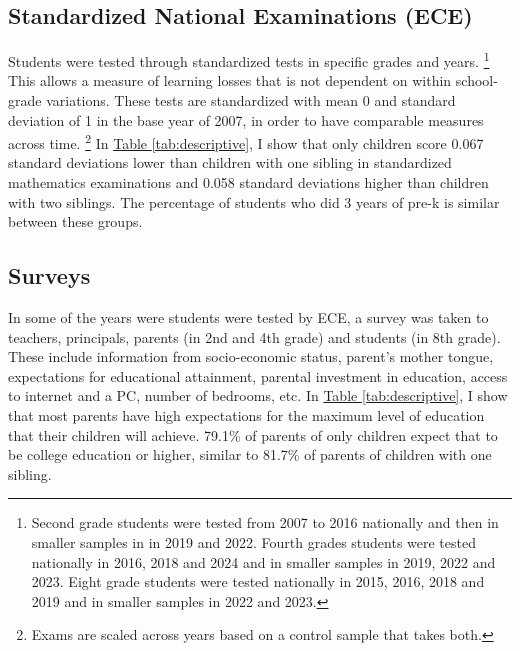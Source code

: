 \subsection{Standardized National Examinations (ECE)}

Students were tested through standardized tests in specific grades and years. \footnote{Second grade students were tested from 2007 to 2016 nationally and then in smaller samples in in 2019 and 2022. Fourth grades students were tested nationally in 2016, 2018 and 2024 and in smaller samples in 2019, 2022 and 2023. Eight grade students were tested nationally in 2015, 2016, 2018 and 2019 and in smaller samples in 2022 and 2023.} This allows a measure of learning losses that is not dependent on within school-grade variations. These tests are standardized with mean 0 and standard deviation of 1 in the base year of 2007, in order to have comparable measures across time. \footnote{Exams are scaled across years based on a control sample that takes both.} In \hyperref[tab:descriptive]{Table \ref{tab:descriptive}}, I show that only children score 0.067 standard deviations lower than children with one sibling in standardized mathematics examinations and 0.058 standard deviations higher than children with two siblings. The percentage of students who did 3 years of pre-k is similar between these groups.  

\subsection{Surveys}

In some of the years were students were tested by ECE, a survey was taken to teachers, principals, parents (in 2nd and 4th grade) and students (in 8th grade). These include information from socio-economic status, parent's mother tongue, expectations for educational attainment, parental investment in education, access to internet and a PC, number of bedrooms, etc. In \hyperref[tab:descriptive]{Table \ref{tab:descriptive}}, I show that most parents have high expectations for the maximum level of education that their children will achieve. 79.1\% of parents of only children expect that to be college education or higher, similar to 81.7\% of parents of children with one sibling.






